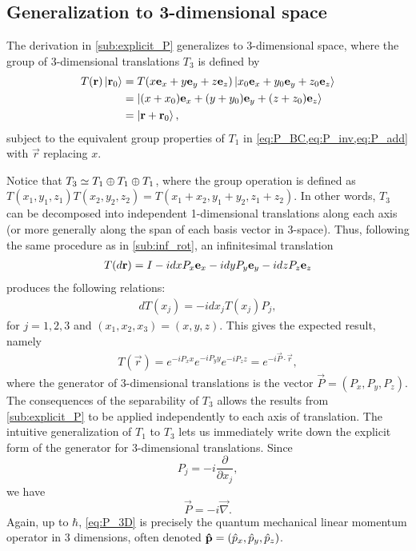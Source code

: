 \subsection{Generalization to 3-dimensional space}\label{sub:3D_translations}
The derivation in \cref{sub:explicit_P} generalizes to 3-dimensional space, where the group of 3-dimensional translations $T_3$ is defined by
\begin{align*}
    T(\mathbf{r})\ket{\mathbf{r}_0}
        &= T(x\mathbf{e}_x + y\mathbf{e}_y + z\mathbf{e}_z)\ket{x_0\mathbf{e}_x + y_0\mathbf{e}_y + z_0\mathbf{e}_z} \\
        &= \ket{(x + x_0)\mathbf{e}_x + (y + y_0)\mathbf{e}_y + (z + z_0)\mathbf{e}_z} \\
        &= \ket{\mathbf{r}+\mathbf{r}_0},
\end{align*}
subject to the equivalent group properties of $T_1$ in \cref{eq:P_BC,eq:P_inv,eq:P_add} with $\vec{r}$ replacing $x$.

\sloppy Notice that $T_3\simeq T_1 \oplus T_1 \oplus T_1$, where the group operation is defined as $T(x_1,y_1,z_1)T(x_2,y_2,z_2) = T(x_1+x_2,y_1+y_2,z_1+z_2)$. In other words, $T_3$ can be decomposed into independent 1-dimensional translations along each axis (or more generally along the span of each basis vector in 3-space). Thus, following the same procedure as in \cref{sub:inf_rot}, an infinitesimal translation
\begin{align*}
    T(d\mathbf{r}) = I - i dx P_x\mathbf{e}_x - idy P_y\mathbf{e}_y - idz P_z\mathbf{e}_z
\end{align*}
produces the following relations:
\begin{align*}
    dT(x_j) = -idx_j T(x_j)P_j,
\end{align*}
for $j=1,2,3$ and $(x_1,x_2,x_3) = (x,y,z)$.
This gives the expected result, namely
\begin{align*}
    T(\vec{r}) = e^{-iP_x x}e^{-iP_y y}e^{-iP_z z} = e^{-i\vec{P}\cdot\vec{r}},
\end{align*}
where the generator of 3-dimensional translations is the vector $\vec{P}=(P_x,P_y,P_z)$. The consequences of the separability of $T_3$ allows the results from \cref{sub:explicit_P} to be applied independently to each axis of translation. The intuitive generalization of $T_1$ to $T_3$ lets us immediately write down the explicit form of the generator for 3-dimensional translations. Since
\begin{equation}
    P_j = -i\frac{\partial}{\partial x_j},
\end{equation}
we have
\begin{equation}
    \vec{P} = -i\vec{\nabla}.\label{eq:P_3D}
\end{equation}
Again, up to $\hbar$, \cref{eq:P_3D} is precisely the quantum mechanical linear momentum operator in 3 dimensions, often denoted $\mathbf{\hat{p}}=(\hat{p}_x,\hat{p}_y,\hat{p}_z)$.


